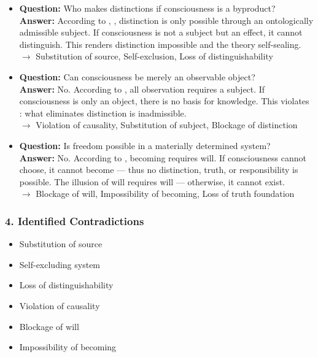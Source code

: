 \documentclass[12pt]{article}
\begin{document}
\begin{itemize}
\item \textbf{Question:} Who makes distinctions if consciousness is a byproduct?\\
\textbf{Answer:} According to \text{[5.1]}, \text{[10.4]}, distinction is only possible through an ontologically admissible subject. If consciousness is not a subject but an effect, it cannot distinguish. This renders distinction impossible and the theory self-sealing.\\
$\rightarrow$ Substitution of source, Self-exclusion, Loss of distinguishability

\item \textbf{Question:} Can consciousness be merely an observable object?\\
\textbf{Answer:} No. According to \text{[11.1.2]}, all observation requires a subject. If consciousness is only an object, there is no basis for knowledge. This violates \text{[3]}: what eliminates distinction is inadmissible.\\
$\rightarrow$ Violation of causality, Substitution of subject, Blockage of distinction

\item \textbf{Question:} Is freedom possible in a materially determined system?\\
\textbf{Answer:} No. According to \text{[12.2]}, becoming requires will. If consciousness cannot choose, it cannot become — thus no distinction, truth, or responsibility is possible. The illusion of will requires will — otherwise, it cannot exist.\\
$\rightarrow$ Blockage of will, Impossibility of becoming, Loss of truth foundation
\end{itemize}

\subsubsection*{4. Identified Contradictions}

\begin{itemize}
\item Substitution of source
\item Self-excluding system
\item Loss of distinguishability
\item Violation of causality
\item Blockage of will
\item Impossibility of becoming
\end{itemize}
\end{document}
